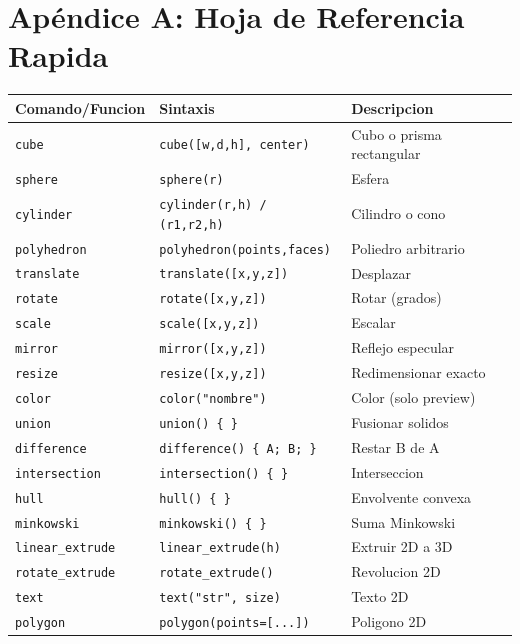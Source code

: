 \documentclass[12pt, oneside, a4paper]{report}
\newcommand{\codigo}[1]{\texttt{#1}}
\begin{document}
\chapter*{Apéndice A: Hoja de Referencia Rapida}

\begin{center}
\footnotesize
\begin{longtable}{lll}
\toprule
Comando/Funcion & Sintaxis & Descripcion \\
\midrule
\endhead
\bottomrule
\endfoot
\codigo{cube} & \codigo{cube([w,d,h], center)} & Cubo o prisma rectangular \\
\codigo{sphere} & \codigo{sphere(r)} & Esfera \\
\codigo{cylinder} & \codigo{cylinder(r,h) / (r1,r2,h)} & Cilindro o cono \\
\codigo{polyhedron} & \codigo{polyhedron(points,faces)} & Poliedro arbitrario \\
\codigo{translate} & \codigo{translate([x,y,z])} & Desplazar \\
\codigo{rotate} & \codigo{rotate([x,y,z])} & Rotar (grados) \\
\codigo{scale} & \codigo{scale([x,y,z])} & Escalar \\
\codigo{mirror} & \codigo{mirror([x,y,z])} & Reflejo especular \\
\codigo{resize} & \codigo{resize([x,y,z])} & Redimensionar exacto \\
\codigo{color} & \codigo{color("nombre")} & Color (solo preview) \\
\codigo{union} & \codigo{union() \{ \}} & Fusionar solidos \\
\codigo{difference} & \codigo{difference() \{ A; B; \}} & Restar B de A \\
\codigo{intersection} & \codigo{intersection() \{ \}} & Interseccion \\
\codigo{hull} & \codigo{hull() \{ \}} & Envolvente convexa \\
\codigo{minkowski} & \codigo{minkowski() \{ \}} & Suma Minkowski \\
\codigo{linear\_extrude} & \codigo{linear\_extrude(h)} & Extruir 2D a 3D \\
\codigo{rotate\_extrude} & \codigo{rotate\_extrude()} & Revolucion 2D \\
\codigo{text} & \codigo{text("str", size)} & Texto 2D \\
\codigo{polygon} & \codigo{polygon(points=[...])} & Poligono 2D \\

\end{longtable}
\end{center}
\end{document}
